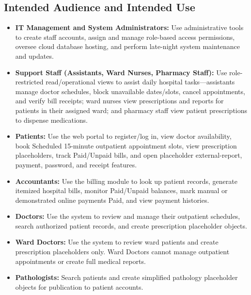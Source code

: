 \documentclass[11pt,a4paper]{article}
\begin{document}
\subsection{Intended Audience and Intended Use}
\begin{itemize}

    \item \textbf{IT Management and System Administrators:} Use administrative tools to create staff accounts, assign and manage role-based access permissions, oversee cloud database hosting, and perform late-night system maintenance and updates.

     \item \textbf{Support Staff (Assistants, Ward Nurses, Pharmacy Staff):} Use role-restricted read/operational views to assist daily hospital tasks—assistants manage doctor schedules, block unavailable dates/slots, cancel appointments, and verify bill receipts; ward nurses view prescriptions and reports for patients in their assigned ward; and pharmacy staff view patient prescriptions to dispense medications.

    \item \textbf{Patients:} Use the web portal to register/log in, view doctor availability, book Scheduled 15-minute outpatient appointment slots, view prescription placeholders, track Paid/Unpaid bills, and open placeholder external-report, payment, password, and receipt features.

    \item \textbf{Accountants:} Use the billing module to look up patient records, generate itemized hospital bills, monitor Paid/Unpaid balances, mark manual or demonstrated online payments Paid, and view payment histories.

    \item \textbf{Doctors:} Use the system to review and manage their outpatient schedules, search authorized patient records, and create prescription placeholder objects.

    \item \textbf{Ward Doctors:} Use the system to review ward patients and create prescription placeholders only. Ward Doctors cannot manage outpatient appointments or create full medical reports.

    \item \textbf{Pathologists:} Search patients and create simplified pathology placeholder objects for publication to patient accounts.
\end{itemize}
\end{document}
